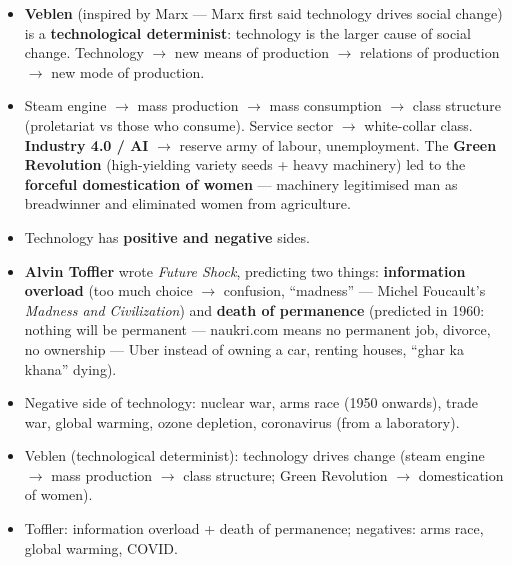 \begin{KeyConcept}
\begin{itemize}
    \item \textbf{Veblen} (inspired by Marx --- Marx first said technology drives social change) is a \textbf{technological determinist}: technology is the larger cause of social change. Technology $\rightarrow$ new means of production $\rightarrow$ relations of production $\rightarrow$ new mode of production.
    \item Steam engine $\rightarrow$ mass production $\rightarrow$ mass consumption $\rightarrow$ class structure (proletariat vs those who consume). Service sector $\rightarrow$ white-collar class. \textbf{Industry 4.0 / AI} $\rightarrow$ reserve army of labour, unemployment. The \textbf{Green Revolution} (high-yielding variety seeds + heavy machinery) led to the \textbf{forceful domestication of women} --- machinery legitimised man as breadwinner and eliminated women from agriculture.
    \item Technology has \textbf{positive and negative} sides.
\end{itemize}
\end{KeyConcept}

\begin{KeyConcept}
\begin{itemize}
    \item \textbf{Alvin Toffler} wrote \textit{Future Shock}, predicting two things: \textbf{information overload} (too much choice $\rightarrow$ confusion, ``madness'' --- Michel Foucault's \textit{Madness and Civilization}) and \textbf{death of permanence} (predicted in 1960: nothing will be permanent --- naukri.com means no permanent job, divorce, no ownership --- Uber instead of owning a car, renting houses, ``ghar ka khana'' dying).
    \item Negative side of technology: nuclear war, arms race (1950 onwards), trade war, global warming, ozone depletion, coronavirus (from a laboratory).
\end{itemize}
\end{KeyConcept}

\begin{QuickRevision}
\begin{itemize}
    \item Veblen (technological determinist): technology drives change (steam engine $\rightarrow$ mass production $\rightarrow$ class structure; Green Revolution $\rightarrow$ domestication of women).
    \item Toffler: information overload + death of permanence; negatives: arms race, global warming, COVID.
\end{itemize}
\end{QuickRevision}

